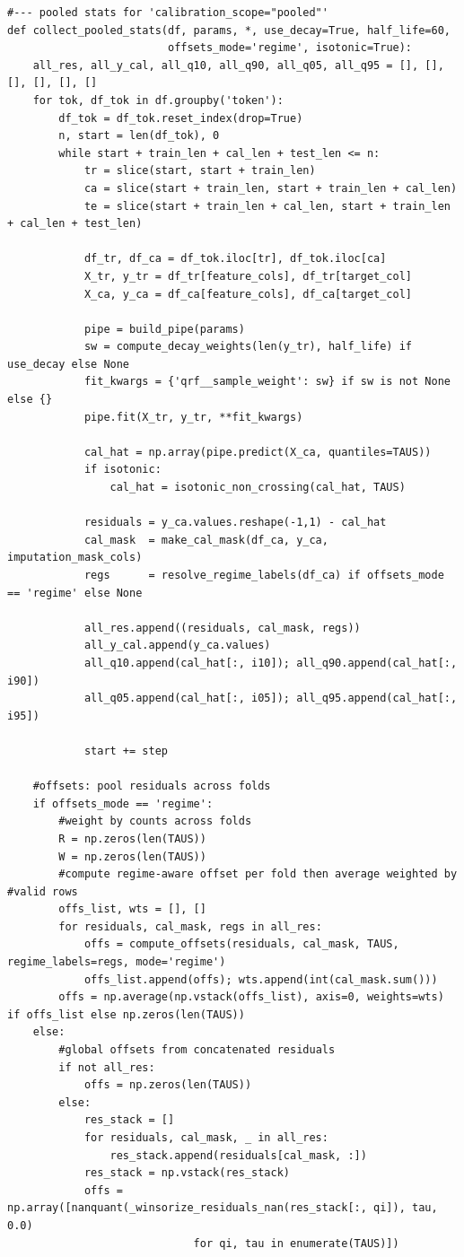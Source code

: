 \documentclass[
  a4paper,
  DIV=11,
  numbers=noendperiod]{scrreprt}
\begin{document}
\begin{verbatim}
#--- pooled stats for 'calibration_scope="pooled"' 
def collect_pooled_stats(df, params, *, use_decay=True, half_life=60,
                         offsets_mode='regime', isotonic=True):
    all_res, all_y_cal, all_q10, all_q90, all_q05, all_q95 = [], [], [], [], [], []
    for tok, df_tok in df.groupby('token'):
        df_tok = df_tok.reset_index(drop=True)
        n, start = len(df_tok), 0
        while start + train_len + cal_len + test_len <= n:
            tr = slice(start, start + train_len)
            ca = slice(start + train_len, start + train_len + cal_len)
            te = slice(start + train_len + cal_len, start + train_len + cal_len + test_len)

            df_tr, df_ca = df_tok.iloc[tr], df_tok.iloc[ca]
            X_tr, y_tr = df_tr[feature_cols], df_tr[target_col]
            X_ca, y_ca = df_ca[feature_cols], df_ca[target_col]

            pipe = build_pipe(params)
            sw = compute_decay_weights(len(y_tr), half_life) if use_decay else None
            fit_kwargs = {'qrf__sample_weight': sw} if sw is not None else {}
            pipe.fit(X_tr, y_tr, **fit_kwargs)

            cal_hat = np.array(pipe.predict(X_ca, quantiles=TAUS))
            if isotonic:
                cal_hat = isotonic_non_crossing(cal_hat, TAUS)

            residuals = y_ca.values.reshape(-1,1) - cal_hat
            cal_mask  = make_cal_mask(df_ca, y_ca, imputation_mask_cols)
            regs      = resolve_regime_labels(df_ca) if offsets_mode == 'regime' else None

            all_res.append((residuals, cal_mask, regs))
            all_y_cal.append(y_ca.values)
            all_q10.append(cal_hat[:, i10]); all_q90.append(cal_hat[:, i90])
            all_q05.append(cal_hat[:, i05]); all_q95.append(cal_hat[:, i95])

            start += step

    #offsets: pool residuals across folds
    if offsets_mode == 'regime':
        #weight by counts across folds
        R = np.zeros(len(TAUS))
        W = np.zeros(len(TAUS))
        #compute regime-aware offset per fold then average weighted by #valid rows
        offs_list, wts = [], []
        for residuals, cal_mask, regs in all_res:
            offs = compute_offsets(residuals, cal_mask, TAUS, regime_labels=regs, mode='regime')
            offs_list.append(offs); wts.append(int(cal_mask.sum()))
        offs = np.average(np.vstack(offs_list), axis=0, weights=wts) if offs_list else np.zeros(len(TAUS))
    else:
        #global offsets from concatenated residuals
        if not all_res:
            offs = np.zeros(len(TAUS))
        else:
            res_stack = []
            for residuals, cal_mask, _ in all_res:
                res_stack.append(residuals[cal_mask, :])
            res_stack = np.vstack(res_stack)
            offs = np.array([nanquant(_winsorize_residuals_nan(res_stack[:, qi]), tau, 0.0)
                             for qi, tau in enumerate(TAUS)])


\end{verbatim}
\end{document}
